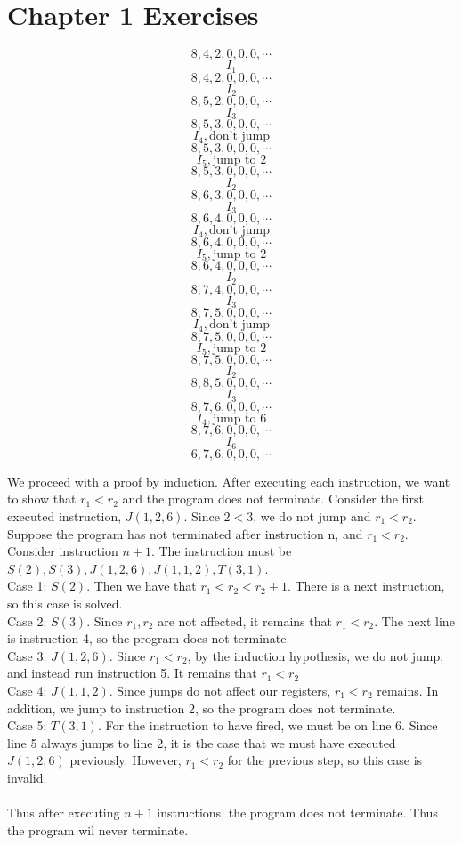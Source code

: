 
\section{Chapter 1 Exercises}

\begin{exe}[2.2]
\[8, 4, 2, 0, 0, 0, \cdots\]
\[I_1\]
\[8, 4, 2, 0, 0, 0, \cdots\]
\[I_2\]
\[8, 5, 2, 0, 0, 0, \cdots\]
\[I_3\]
\[8, 5, 3, 0, 0, 0, \cdots\]
\[I_4, \text{don't jump}\]
\[8, 5, 3, 0, 0, 0, \cdots\]
\[I_5, \text{jump to 2}\]
\[8, 5, 3, 0, 0, 0, \cdots\]
\[I_2\]
\[8, 6, 3, 0, 0, 0, \cdots\]
\[I_3\]
\[8, 6, 4, 0, 0, 0, \cdots\]
\[I_4, \text{don't jump}\]
\[8, 6, 4, 0, 0, 0, \cdots\]
\[I_5, \text{jump to 2}\]
\[8, 6, 4, 0, 0, 0, \cdots\]
\[I_2\]
\[8, 7, 4, 0, 0, 0, \cdots\]
\[I_3\]
\[8, 7, 5, 0, 0, 0, \cdots\]
\[I_4, \text{don't jump}\]
\[8, 7, 5, 0, 0, 0, \cdots\]
\[I_5, \text{jump to 2}\]
\[8, 7, 5, 0, 0, 0, \cdots\]
\[I_2\]
\[8, 8, 5, 0, 0, 0, \cdots\]
\[I_3\]
\[8, 7, 6, 0, 0, 0, \cdots\]
\[I_4, \text{jump to 6}\]
\[8, 7, 6, 0, 0, 0, \cdots\]
\[I_6\]
\[6, 7, 6, 0, 0, 0, \cdots\]
    
\end{exe}
\begin{exe}[2.3]
We proceed with a proof by induction. After executing each instruction, we want to show that $r_1 < r_2$ and the program does not terminate. Consider the first executed instruction, $J(1, 2, 6)$. Since $2 < 3$, we do not jump and $r_1 < r_2$. Suppose the program has not terminated after instruction n, and $r_1 < r_2$. Consider instruction $n+1$. The instruction must be $S(2), S(3), J(1, 2, 6), J(1, 1, 2), T(3, 1)$. \\
Case 1: $S(2)$. Then we have that $r_1 < r_2 < r_2 + 1$. There is a next instruction, so this case is solved.\\
Case 2: $S(3)$. Since $r_1, r_2$ are not affected, it remains that $r_1 < r_2$. The next line is instruction 4, so the program does not terminate.\\
Case 3: $J(1, 2, 6)$. Since $r_1 < r_2$, by the induction hypothesis, we do not jump, and instead run instruction 5. It remains that $r_1 < r_2$\\
Case 4: $J(1, 1, 2)$. Since jumps do not affect our registers, $r_1 < r_2$ remains. In addition, we jump to instruction 2, so the program does not terminate.\\
Case 5: $T(3,1)$. For the instruction to have fired, we must be on line 6. Since line 5 always jumps to line 2, it is the case that we must have executed $J(1, 2, 6)$ previously. However, $r_1 < r_2$ for the previous step, so this case is invalid.\\\\
Thus after executing $n + 1$ instructions, the program does not terminate. Thus the program wil never terminate.
\end{exe}

